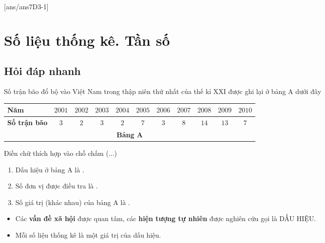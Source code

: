 [ans/ans7D3-1]
\section{Số liệu thống kê. Tần số}
\subsection{Hỏi đáp nhanh}
Số trận bão đổ bộ vào Việt Nam trong thập niên thứ nhất của thế kỉ XXI được ghi lại ở bảng A dưới đây
\begin{center}
	\begin{tabular}{|l|c|c|c|c|c|c|c|c|c|c|}
		\hline
		\textbf{Năm} &$2001$ &$2002$ &$2003$ &$2004$ &$2005$ &$2006$ &$2007$ &$2008$ &$2009$ &$2010$\\
		\hline
		\textbf{Số trận bão} &$3$ &$2$ &$3$ &$2$ &$7$ &$3$ &$8$ &$14$ &$13$ &$7$\\
		\hline
		\multicolumn{11}{c}{\textbf{Bảng A}}
	\end{tabular}
\end{center}

\begin{ex}%
Điền chữ thích hợp vào chỗ chấm (...)
\begin{enumerate}
\item Dấu hiệu ở bảng A là .
\item Số đơn vị được điều tra là .
\item Số giá trị (khác nhau) của bảng A là .
\end{enumerate}
\begin{note}
	\begin{itemize}
		\item Các \textbf{vấn đề xã hội} được quan tâm, các \textbf{hiện tượng tự nhiên} được nghiên cứu gọi là DẤU HIỆU.
		\item Mỗi số liệu thống kê là một giá trị của dấu hiệu.
	\end{itemize}
\end{note}
\end{ex}

